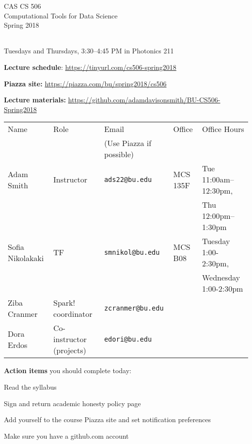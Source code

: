 \documentclass[11pt]{article}
\begin{document}

\begin{center}
\LARGE CAS CS 506\\
\Large Computational Tools for Data Science\\
\Large\rm Spring 2018\\~\\
\end{center}

 Tuesdays and Thursdays, 3:30--4:45
PM in Photonics 211

\noindent \textbf{Lecture schedule}: 
\url{https://tinyurl.com/cs506-spring2018}

\noindent \textbf{Piazza site:} \url{https://piazza.com/bu/spring2018/cs506}

\noindent \textbf{Lecture materials:} \url{https://github.com/adamdavisonsmith/BU-CS506-Spring2018}

\medskip
\noindent
\begin{small}
  \begin{tabular}{|l|l|l|l|l|}
    \hline
    Name & Role & Email & Office & Office Hours\\
         & & (Use Piazza if possible) & &  \\
    \hline
    \hline
    Adam Smith & Instructor & \texttt{ads22@bu.edu}
                        & MCS 135F & Tue 11:00am--12:30pm, \\
         & & & & Thu
                 12:00pm--1:30pm \\
    \hline
    Sofia Nikolakaki & TF & \texttt{smnikol@bu.edu} & MCS B08 & 
                                                                Tuesday 1:00-2:30pm, \\
         & & & & Wednesday 1:00-2:30pm \\
    \hline
    Ziba Cranmer & Spark! coordinator & \texttt{zcranmer@bu.edu}& & \\
    \hline
    Dora Erdos & Co-instructor (projects) & \texttt{edori@bu.edu} &
                                 & \\
    \hline 
  \end{tabular}
\end{small}


\medskip


\noindent \textbf{Action items} you should complete today:
\begin{compactitem}
\item Read the syllabus
\item Sign and return academic honesty policy page
\item Add yourself to the course Piazza site and set notification preferences
\item Make sure you have a github.com account 
\end{compactitem}
\end{document}
